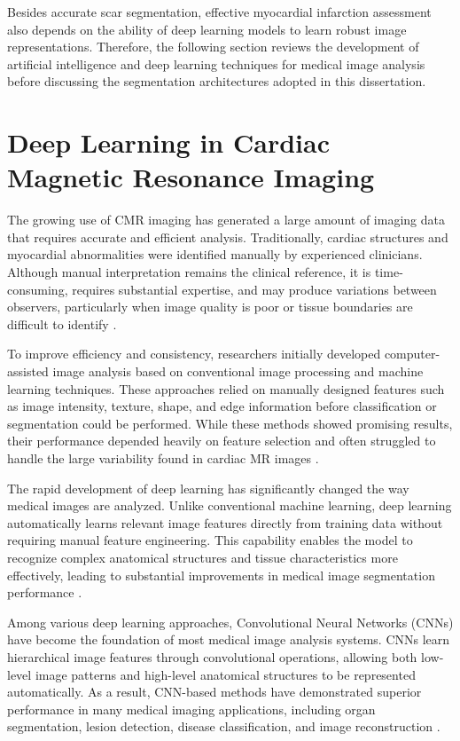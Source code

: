 Besides accurate scar segmentation, effective myocardial infarction assessment also depends on the ability of deep learning models to learn robust image representations. Therefore, the following section reviews the development of artificial intelligence and deep learning techniques for medical image analysis before discussing the segmentation architectures adopted in this dissertation.

\section{Deep Learning in Cardiac Magnetic Resonance Imaging}
\label{sec:dl-cmr}

The growing use of CMR imaging has generated a large amount of imaging data that requires accurate and efficient analysis. Traditionally, cardiac structures and myocardial abnormalities were identified manually by experienced clinicians. Although manual interpretation remains the clinical reference, it is time-consuming, requires substantial expertise, and may produce variations between observers, particularly when image quality is poor or tissue boundaries are difficult to identify \citep{Petitjean2011,Kramer2020}.

To improve efficiency and consistency, researchers initially developed computer-assisted image analysis based on conventional image processing and machine learning techniques. These approaches relied on manually designed features such as image intensity, texture, shape, and edge information before classification or segmentation could be performed. While these methods showed promising results, their performance depended heavily on feature selection and often struggled to handle the large variability found in cardiac MR images \citep{Litjens2017}.

The rapid development of deep learning has significantly changed the way medical images are analyzed. Unlike conventional machine learning, deep learning automatically learns relevant image features directly from training data without requiring manual feature engineering. This capability enables the model to recognize complex anatomical structures and tissue characteristics more effectively, leading to substantial improvements in medical image segmentation performance \citep{LeCun2015,Litjens2017}.

Among various deep learning approaches, Convolutional Neural Networks (CNNs) have become the foundation of most medical image analysis systems. CNNs learn hierarchical image features through convolutional operations, allowing both low-level image patterns and high-level anatomical structures to be represented automatically. As a result, CNN-based methods have demonstrated superior performance in many medical imaging applications, including organ segmentation, lesion detection, disease classification, and image reconstruction \citep{LeCun2015,Shen2017}.

